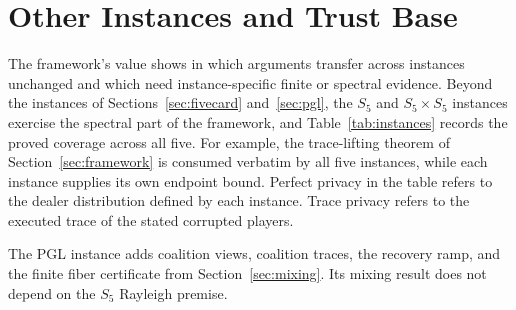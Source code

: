 \documentclass[runningheads]{llncs}
\begin{document}
\section{Other Instances and Trust Base}\label{sec:instances}

The framework's value shows in which arguments transfer across instances
unchanged and which need instance-specific finite or spectral evidence.
Beyond the instances of Sections~\ref{sec:fivecard} and~\ref{sec:pgl}, the
$S_5$ and $S_5\times S_5$ instances exercise the spectral part of the
framework, and Table~\ref{tab:instances} records the proved coverage
across all five. For example, the trace-lifting theorem of
Section~\ref{sec:framework} is consumed verbatim by all five instances,
while each instance supplies its own endpoint bound. Perfect privacy in
the table refers to the dealer distribution defined by each
instance. Trace privacy refers to the executed trace of the stated corrupted
players.

The PGL instance adds coalition views, coalition traces, the recovery ramp,
and the finite fiber certificate from Section~\ref{sec:mixing}. Its mixing
result does not depend on the $S_5$ Rayleigh premise.
\end{document}
